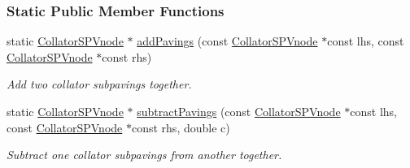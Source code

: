 \subsubsection*{\-Static \-Public \-Member \-Functions}
\begin{DoxyCompactItemize}
\item 
static \hyperlink{classsubpavings_1_1CollatorSPVnode}{\-Collator\-S\-P\-Vnode} $\ast$ \hyperlink{classsubpavings_1_1CollatorSPVnode_af92d7a31e4c7f97661d3e812948a8aee}{add\-Pavings} (const \hyperlink{classsubpavings_1_1CollatorSPVnode}{\-Collator\-S\-P\-Vnode} $\ast$const lhs, const \hyperlink{classsubpavings_1_1CollatorSPVnode}{\-Collator\-S\-P\-Vnode} $\ast$const rhs)
\begin{DoxyCompactList}\small\item\em \-Add two collator subpavings together. \end{DoxyCompactList}\item 
static \hyperlink{classsubpavings_1_1CollatorSPVnode}{\-Collator\-S\-P\-Vnode} $\ast$ \hyperlink{classsubpavings_1_1CollatorSPVnode_ab662ab5025178c145b83b386ef475415}{subtract\-Pavings} (const \hyperlink{classsubpavings_1_1CollatorSPVnode}{\-Collator\-S\-P\-Vnode} $\ast$const lhs, const \hyperlink{classsubpavings_1_1CollatorSPVnode}{\-Collator\-S\-P\-Vnode} $\ast$const rhs, double c)
\begin{DoxyCompactList}\small\item\em \-Subtract one collator subpavings from another together. \end{DoxyCompactList}\end{DoxyCompactItemize}
